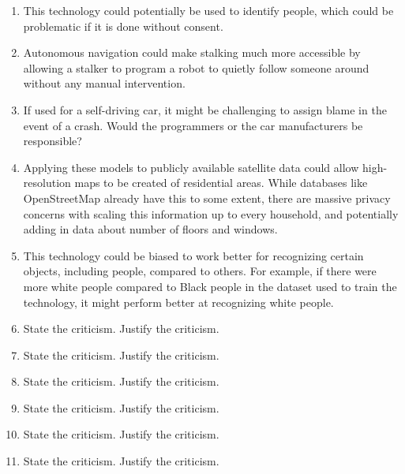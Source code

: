 \begin{enumerate}
    \item This technology could potentially be used to identify people, which could be problematic if it is done without consent.
    \item Autonomous navigation could make stalking much more accessible by allowing a stalker to program a robot to quietly follow someone around without any manual intervention.
    \item If used for a self-driving car, it might be challenging to assign blame in the event of a crash. Would the programmers or the car manufacturers be responsible?
    \item Applying these models to publicly available satellite data could allow high-resolution maps to be created of residential areas. While databases like OpenStreetMap already have this to some extent, there are massive privacy concerns with scaling this information up to every household, and potentially adding in data about number of floors and windows.
    \item This technology could be biased to work better for recognizing certain objects, including people, compared to others. For example, if there were more white people compared to Black people in the dataset used to train the technology, it might perform better at recognizing white people.
    \item State the criticism. Justify the criticism.
    \item State the criticism. Justify the criticism.
    \item State the criticism. Justify the criticism.
    \item State the criticism. Justify the criticism.
    \item State the criticism. Justify the criticism.
    \item State the criticism. Justify the criticism.
\end{enumerate}


